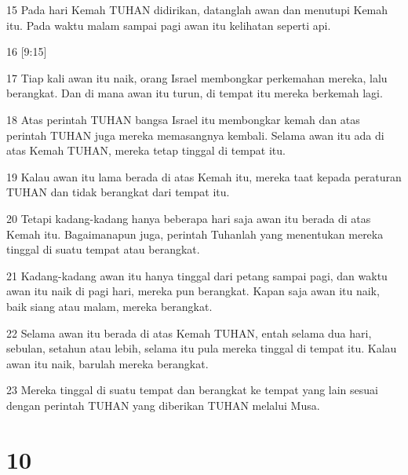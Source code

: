\par 15 Pada hari Kemah TUHAN didirikan, datanglah awan dan menutupi Kemah itu. Pada waktu malam sampai pagi awan itu kelihatan seperti api.
\par 16 [9:15]
\par 17 Tiap kali awan itu naik, orang Israel membongkar perkemahan mereka, lalu berangkat. Dan di mana awan itu turun, di tempat itu mereka berkemah lagi.
\par 18 Atas perintah TUHAN bangsa Israel itu membongkar kemah dan atas perintah TUHAN juga mereka memasangnya kembali. Selama awan itu ada di atas Kemah TUHAN, mereka tetap tinggal di tempat itu.
\par 19 Kalau awan itu lama berada di atas Kemah itu, mereka taat kepada peraturan TUHAN dan tidak berangkat dari tempat itu.
\par 20 Tetapi kadang-kadang hanya beberapa hari saja awan itu berada di atas Kemah itu. Bagaimanapun juga, perintah Tuhanlah yang menentukan mereka tinggal di suatu tempat atau berangkat.
\par 21 Kadang-kadang awan itu hanya tinggal dari petang sampai pagi, dan waktu awan itu naik di pagi hari, mereka pun berangkat. Kapan saja awan itu naik, baik siang atau malam, mereka berangkat.
\par 22 Selama awan itu berada di atas Kemah TUHAN, entah selama dua hari, sebulan, setahun atau lebih, selama itu pula mereka tinggal di tempat itu. Kalau awan itu naik, barulah mereka berangkat.
\par 23 Mereka tinggal di suatu tempat dan berangkat ke tempat yang lain sesuai dengan perintah TUHAN yang diberikan TUHAN melalui Musa.

\chapter{10}


